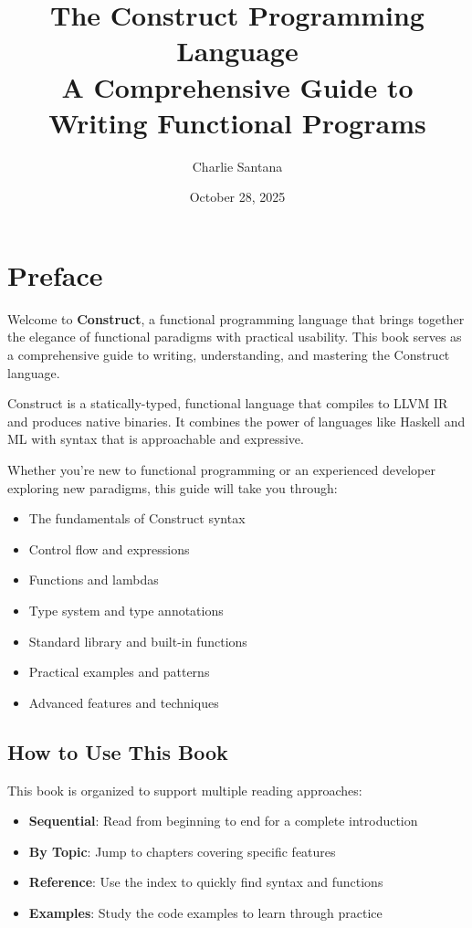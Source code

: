 \documentclass[11pt,twoside,openright]{book}
\title{\Huge \textbf{The Construct Programming Language}\\
        \Large A Comprehensive Guide to Writing Functional Programs}
\author{\Large Charlie Santana}
\date{\Large October 28, 2025}
\begin{document}
\frontmatter
\maketitle

\chapter*{Preface}

Welcome to \textbf{Construct}, a functional programming language that brings together the elegance of functional paradigms with practical usability. This book serves as a comprehensive guide to writing, understanding, and mastering the Construct language.

Construct is a statically-typed, functional language that compiles to LLVM IR and produces native binaries. It combines the power of languages like Haskell and ML with syntax that is approachable and expressive.

Whether you're new to functional programming or an experienced developer exploring new paradigms, this guide will take you through:

\begin{itemize}
    \item The fundamentals of Construct syntax
    \item Control flow and expressions
    \item Functions and lambdas
    \item Type system and type annotations
    \item Standard library and built-in functions
    \item Practical examples and patterns
    \item Advanced features and techniques
\end{itemize}

\section*{How to Use This Book}

This book is organized to support multiple reading approaches:

\begin{itemize}
    \item \textbf{Sequential}: Read from beginning to end for a complete introduction
    \item \textbf{By Topic}: Jump to chapters covering specific features
    \item \textbf{Reference}: Use the index to quickly find syntax and functions
    \item \textbf{Examples}: Study the code examples to learn through practice
\end{itemize}
\end{document}
